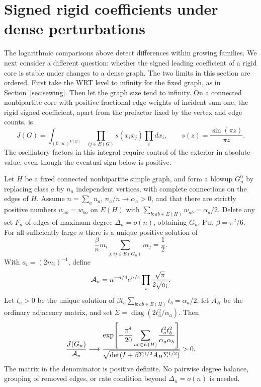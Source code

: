 \section{Signed rigid coefficients under dense perturbations}
\label{den:section}

The logarithmic comparisons above detect differences within growing families.
We next consider a different question: whether the signed leading coefficient of a rigid core is stable under changes to a dense graph. The two limits in this section are ordered. First take the WRT level to infinity for the fixed graph, as in Section~\ref{sec:sewing}. Then let the graph size tend to infinity. On a connected nonbipartite core with positive fractional edge weights of incident sum one, the rigid signed coefficient, apart from the prefactor fixed by the vertex and edge counts, is
\[
 J(G)=\int_{(0,\infty)^{V(G)}}\prod_{ij\in E(G)}s(x_i x_j)\prod_i dx_i,
 \qquad s(z)=\frac{\sin(\pi z)}{\pi z}.
\]
The oscillatory factors in this integral require control of the exterior in absolute value, even though the eventual sign below is positive.

\begin{theorem}\label{den:thm}
Let \(H\) be a fixed connected nonbipartite simple graph, and form a blowup \(G_n^0\) by replacing class \(a\) by \(n_a\) independent vertices, with complete connections on the edges of \(H\). Assume \(n=\sum_a n_a\), \(n_a/n\to\alpha_a>0\), and that there are strictly positive numbers \(w_{ab}=w_{ba}\) on \(E(H)\) with \(\sum_{b:ab\in E(H)}w_{ab}=\alpha_a/2\). Delete any set \(F_n\) of edges of maximum degree \(\Delta_n=o(n)\), obtaining \(G_n\). Put \(\beta=\pi^2/6\). For all sufficiently large \(n\) there is a unique positive solution of
\begin{equation}\label{den:site}
 \frac{\beta}{n}m_i\sum_{j:ij\in E(G_n)}m_j=\frac12 .
\end{equation}
With \(a_i=(2m_i)^{-1}\), define
\[
 {\cal A}_n=n^{-n/4} e^{n/4}\prod_i\frac{\sqrt\pi}{2\sqrt{a_i}}.
\]
Let \(t_a>0\) be the unique solution of
\(\beta t_a\sum_{b:ab\in E(H)}t_b=\alpha_a/2\), let \(A_H\) be the ordinary adjacency matrix, and set \(\Sigma=\operatorname{diag}(2t_a^2/\alpha_a)\). Then
\begin{equation}\label{den:result}
 \frac{J(G_n)}{{\cal A}_n}\longrightarrow
 \frac{\displaystyle
   \exp\!\left[-\frac{\pi^4}{20}\sum_{ab\in E(H)}
                             \frac{t_a^2t_b^2}{\alpha_a\alpha_b}\right]}
 {\sqrt{\det(I+\beta\Sigma^{1/2}A_H\Sigma^{1/2})}}>0 .
\end{equation}
The matrix in the denominator is positive definite. No pairwise degree balance, grouping of removed edges, or rate condition beyond \(\Delta_n=o(n)\) is needed.
\end{theorem}

